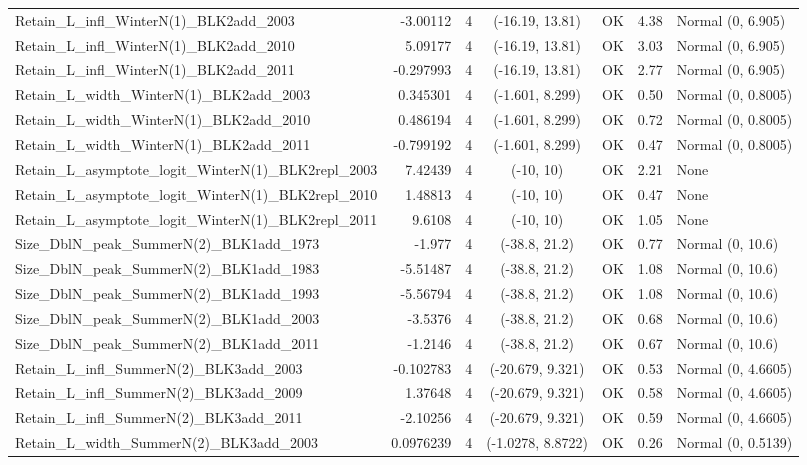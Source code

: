 \documentclass[12pt,]{article}
\begin{document}
\begin{landscape}
\begin{longtable}{lrcccll}
  Retain\_L\_infl\_WinterN(1)\_BLK2add\_2003 & -3.00112 & 4 & (-16.19, 13.81) & OK & 4.38 & Normal (0, 6.905) \\ 
  Retain\_L\_infl\_WinterN(1)\_BLK2add\_2010 & 5.09177 & 4 & (-16.19, 13.81) & OK & 3.03 & Normal (0, 6.905) \\ 
  Retain\_L\_infl\_WinterN(1)\_BLK2add\_2011 & -0.297993 & 4 & (-16.19, 13.81) & OK & 2.77 & Normal (0, 6.905) \\ 
  Retain\_L\_width\_WinterN(1)\_BLK2add\_2003 & 0.345301 & 4 & (-1.601, 8.299) & OK & 0.50 & Normal (0, 0.8005) \\ 
  Retain\_L\_width\_WinterN(1)\_BLK2add\_2010 & 0.486194 & 4 & (-1.601, 8.299) & OK & 0.72 & Normal (0, 0.8005) \\ 
  Retain\_L\_width\_WinterN(1)\_BLK2add\_2011 & -0.799192 & 4 & (-1.601, 8.299) & OK & 0.47 & Normal (0, 0.8005) \\ 
  Retain\_L\_asymptote\_logit\_WinterN(1)\_BLK2repl\_2003 & 7.42439 & 4 & (-10, 10) & OK & 2.21 & None \\ 
  Retain\_L\_asymptote\_logit\_WinterN(1)\_BLK2repl\_2010 & 1.48813 & 4 & (-10, 10) & OK & 0.47 & None \\ 
  Retain\_L\_asymptote\_logit\_WinterN(1)\_BLK2repl\_2011 & 9.6108 & 4 & (-10, 10) & OK & 1.05 & None \\ 
  Size\_DblN\_peak\_SummerN(2)\_BLK1add\_1973 & -1.977 & 4 & (-38.8, 21.2) & OK & 0.77 & Normal (0, 10.6) \\ 
  Size\_DblN\_peak\_SummerN(2)\_BLK1add\_1983 & -5.51487 & 4 & (-38.8, 21.2) & OK & 1.08 & Normal (0, 10.6) \\ 
  Size\_DblN\_peak\_SummerN(2)\_BLK1add\_1993 & -5.56794 & 4 & (-38.8, 21.2) & OK & 1.08 & Normal (0, 10.6) \\ 
  Size\_DblN\_peak\_SummerN(2)\_BLK1add\_2003 & -3.5376 & 4 & (-38.8, 21.2) & OK & 0.68 & Normal (0, 10.6) \\ 
  Size\_DblN\_peak\_SummerN(2)\_BLK1add\_2011 & -1.2146 & 4 & (-38.8, 21.2) & OK & 0.67 & Normal (0, 10.6) \\ 
  Retain\_L\_infl\_SummerN(2)\_BLK3add\_2003 & -0.102783 & 4 & (-20.679, 9.321) & OK & 0.53 & Normal (0, 4.6605) \\ 
  Retain\_L\_infl\_SummerN(2)\_BLK3add\_2009 & 1.37648 & 4 & (-20.679, 9.321) & OK & 0.58 & Normal (0, 4.6605) \\ 
  Retain\_L\_infl\_SummerN(2)\_BLK3add\_2011 & -2.10256 & 4 & (-20.679, 9.321) & OK & 0.59 & Normal (0, 4.6605) \\ 
  Retain\_L\_width\_SummerN(2)\_BLK3add\_2003 & 0.0976239 & 4 & (-1.0278, 8.8722) & OK & 0.26 & Normal (0, 0.5139) \\ 

\end{longtable}
\end{landscape}
\end{document}
